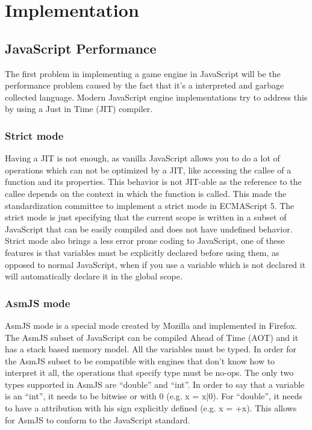 \chapter{Implementation}
\label{chapter:Chapter 4}

\section{JavaScript Performance}

The first problem in implementing a game engine in JavaScript will be the performance problem caused by the fact that it’s a interpreted and garbage collected language. Modern JavaScript engine implementations try to address this by using a Just in Time (JIT) compiler.

\subsection{Strict mode}

Having a JIT is not enough, as vanilla JavaScript allows you to do a lot of operations which can not be optimized by a JIT, like accessing the callee of a function and its properties. This behavior is not JIT-able as the reference to the callee depends on the context in which the function is called. This made the standardization committee to implement a strict mode in ECMAScript 5. The strict mode is just specifying that the current scope is written in a subset of JavaScript that can be easily compiled and does not have undefined behavior. Strict mode also brings a less error prone coding to JavaScript, one of these features is that variables must be explicitly declared before using them, as opposed to normal JavaScript, when if you use a variable which is not declared it will automatically declare it in the global scope.

\subsection{AsmJS mode}

AsmJS mode is a special mode created by Mozilla and implemented in Firefox. The AsmJS subset of JavaScript can be compiled Ahead of Time (AOT) and it has a stack based memory model. All the variables must be typed. In order for the AsmJS subset to be compatible with engines that don’t know how to interpret it all, the operations that specify type must be no-ops. The only two types supported in AsmJS are “double” and “int”. In order to say that a variable is an “int”, it needs to be bitwise or with 0 (e.g. x = x|0). For “double”, it needs to have a attribution with his sign explicitly defined (e.g. x = +x). This allows for AsmJS to conform to the JavaScript standard.


